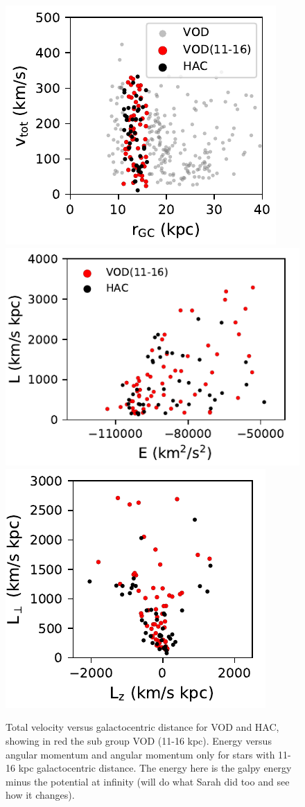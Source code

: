 \documentclass[fleqn,usenatbib]{mnras}
\begin{document}
   \begin{figure}
	\includegraphics[scale=0.398]{vtot_r.pdf}
        \includegraphics[scale=0.398]{E_L.pdf}
        \includegraphics[scale=0.398]{Lz_Lp.pdf}
		       	       	       	       \vspace{-0.4cm}
   \caption{Total velocity versus galactocentric distance for VOD and
     HAC, showing in red the sub group VOD (11-16 kpc). Energy versus
     angular momentum and angular momentum only for stars with 11-16
     kpc galactocentric distance. The energy here is the galpy energy
     minus the potential at infinity (will do what Sarah did too and
     see how it changes).}
    \label{fig:energy}
\end{figure}
%
%   
\end{document}
